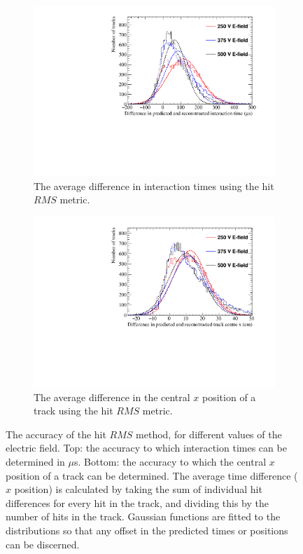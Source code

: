 \begin{figure}
  \centering
  \begin{subfigure}{0.6\textwidth}
    \centering
    \includegraphics[width=\textwidth]{Canvas_AvDiff_T_RMS_ElecField}
    \caption{The average difference in interaction times using the hit $RMS$ metric.}
    \label{fig:DiffElecStudy_AvDiffRMS_T}
  \end{subfigure}
  \begin{subfigure}{0.6\textwidth}
    \centering
    \includegraphics[width=\textwidth]{Canvas_AvDiff_X_RMS_ElecField}
    \caption{The average difference in the central $x$ position of a track using the hit $RMS$ metric.}
    \label{fig:DiffElecStudy_AvDiffRMS_X}
  \end{subfigure}
  \caption[Comparing the accuracy of the hit $RMS$ method, as the electric field changes]
          {The accuracy of the hit $RMS$ method, for different values of the electric field. Top: the accuracy to which interaction times can be determined in $\mu$s. Bottom: the accuracy to which the central $x$ position of a track can be determined. The average time difference ($x$ position) is calculated by taking the sum of individual hit differences for every hit in the track, and dividing this by the number of hits in the track. Gaussian functions are fitted to the distributions so that any offset in the predicted times or positions can be discerned.}
  \label{fig:DiffElecStudy_AvDiff_RMS}
\end{figure}

